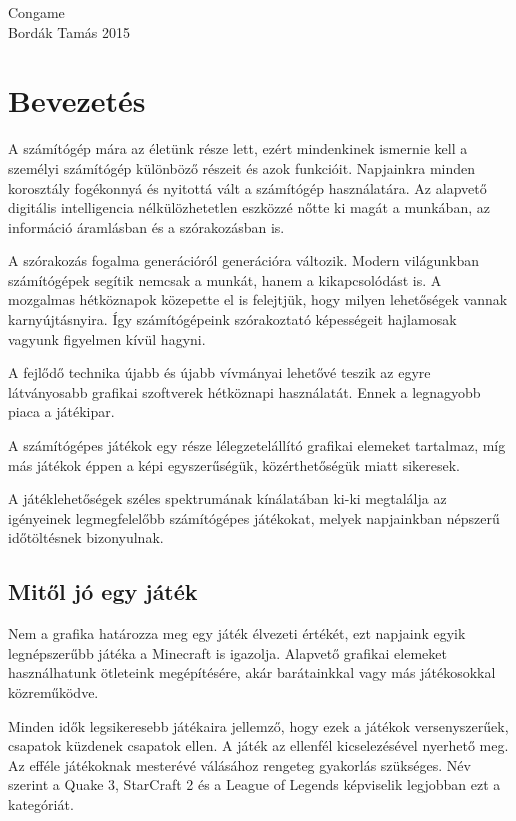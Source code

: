 \documentclass[]{article}
\date{}
\begin{document}
\begin{titlepage} 
	 \vfill {\huge Congame} \\[20pt] {\Large Bordák Tamás} \vfill  \vfill {\Large 2015} 
\end{titlepage}

\tableofcontents
\newpage
\section{Bevezetés}

A számítógép mára az életünk része lett, ezért mindenkinek ismernie kell
a személyi számítógép különböző részeit és azok funkcióit. Napjainkra
minden korosztály fogékonnyá és nyitottá vált a számítógép használatára.
Az alapvető digitális intelligencia nélkülözhetetlen eszközzé nőtte ki
magát a munkában, az információ áramlásban és a szórakozásban is.

A szórakozás fogalma generációról generációra változik. Modern
világunkban számítógépek segítik nemcsak a munkát, hanem a
kikapcsolódást is. A mozgalmas hétköznapok közepette el is felejtjük,
hogy milyen lehetőségek vannak karnyújtásnyira. Így számítógépeink
szórakoztató képességeit hajlamosak vagyunk figyelmen kívül hagyni.

A fejlődő technika újabb és újabb vívmányai lehetővé teszik az egyre
látványosabb grafikai szoftverek hétköznapi használatát. Ennek a
legnagyobb piaca a játékipar.

A számítógépes játékok egy része lélegzetelállító grafikai elemeket
tartalmaz, míg más játékok éppen a képi egyszerűségük, közérthetőségük
miatt sikeresek.

A játéklehetőségek széles spektrumának kínálatában ki-ki megtalálja az
igényeinek legmegfelelőbb számítógépes játékokat, melyek napjainkban
népszerű időtöltésnek bizonyulnak.


\subsection{ Mitől jó egy játék}

Nem a grafika határozza meg egy játék élvezeti értékét, ezt napjaink
egyik legnépszerűbb játéka a Minecraft is igazolja. Alapvető grafikai
elemeket használhatunk ötleteink megépítésére, akár barátainkkal vagy
más játékosokkal közreműködve.

Minden idők legsikeresebb játékaira jellemző, hogy ezek a játékok
versenyszerűek, csapatok küzdenek csapatok ellen. A játék az ellenfél
kicselezésével nyerhető meg. Az efféle játékoknak mesterévé válásához
rengeteg gyakorlás szükséges. Név szerint a Quake 3, StarCraft 2 és a
League of Legends képviselik legjobban ezt a kategóriát.
\end{document}

